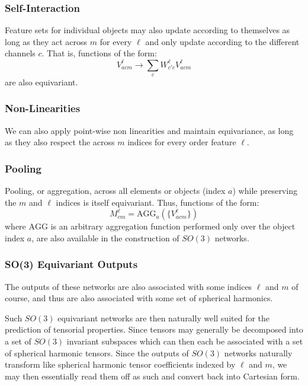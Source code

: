 \documentclass[10pt,a4paper]{article}
\begin{document}
\subsubsection{Self-Interaction}
Feature sets for individual objects may also update according to themselves as long as they act across $m$ for every $\ell$ and only update according to the different channels $c$. That is, functions of the form:
$$
V_{acm}^{\ell} \rightarrow  \sum _{c}W^{\ell}_{c'c}V_{acm}^{\ell}
$$
are also equivariant. 

\subsubsection{Non-Linearities}
We can also apply point-wise non linearities and maintain equivariance, as long as they also respect the across $m$ indices for every order feature $\ell$.

\subsubsection{Pooling}
Pooling, or aggregation, across all elements or objects (index $a$) while preserving the $m$ and $\ell$ indices is itself equivariant. Thus, functions of the form:
$$
 M_{cm}^{\ell} = \text{AGG}_{a}(\lbrace V_{acm}^{\ell}\rbrace)
$$ 
where $\text{AGG}$ is an arbitrary aggregation function performed only over the object index $a$, are also available in the construction of $SO(3)$ networks.
 
\subsubsection*{SO(3) Equivariant Outputs}
The outputs of these networks are also associated with some indices $\ell$ and $m$ of course, and thus are also associated with some set of spherical harmonics.

Such $SO(3)$ equivariant networks are then naturally well suited for the prediction of tensorial properties. Since tensors may generally be decomposed into a set of $SO(3)$ invariant subspaces which can then each be associated with a set of spherical harmonic tensors. Since the outputs of $SO(3)$ networks naturally transform like spherical harmonic tensor coefficients indexed by $\ell$ and $m$, we may then essentially read them off as such and convert back into Cartesian form.
\end{document}
